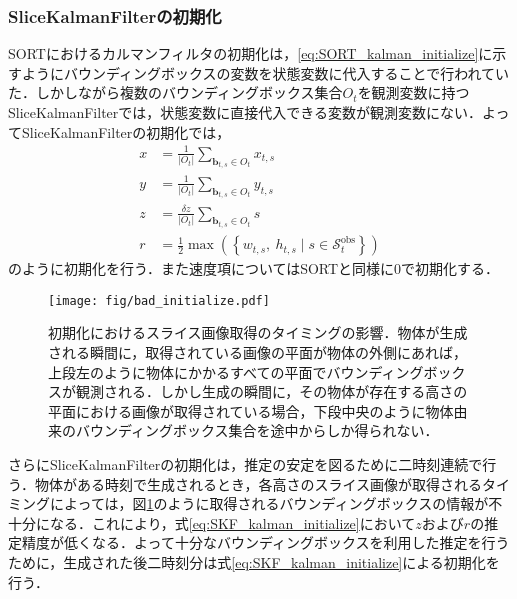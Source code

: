             \subsubsection{SliceKalmanFilterの初期化}

            SORTにおけるカルマンフィルタの初期化は，\ref{eq:SORT_kalman_initialize}に示すようにバウンディングボックスの変数を状態変数に代入することで行われていた．しかしながら複数のバウンディングボックス集合$O_t$を観測変数に持つSliceKalmanFilterでは，状態変数に直接代入できる変数が観測変数にない．よってSliceKalmanFilterの初期化では，
            \begin{equation}
                \label{eq:SKF_kalman_initialize}
                \begin{aligned}
                    x &= \frac{1}{\left|O_t\right|} \sum_{\bm{b}_{t,s} \in O_t} x_{t,s}
                    \\ y &= \frac{1}{\left|O_t\right|} \sum_{\bm{b}_{t,s} \in O_t} y_{t,s}
                    \\ z &= \frac{\delta z}{\left|O_t\right|} \sum_{\bm{b}_{t,s} \in O_t} s 
                    \\ r &= \frac{1}{2} \max \left(\left\{w_{t,s}, ~ h_{t,s} \mid s \in \mathcal{S}_t^{\text{obs}}\right\}\right)
                \end{aligned}
            \end{equation}
            のように初期化を行う．また速度項についてはSORTと同様に$0$で初期化する．

            \begin{figure}[t]
                \centering
                \texttt{[image: fig/bad\_initialize.pdf]}
                \caption[初期化におけるスライス画像取得のタイミングの影響]{初期化におけるスライス画像取得のタイミングの影響．物体が生成される瞬間に，取得されている画像の平面が物体の外側にあれば，上段左のように物体にかかるすべての平面でバウンディングボックスが観測される．しかし生成の瞬間に，その物体が存在する高さの平面における画像が取得されている場合，下段中央のように物体由来のバウンディングボックス集合を途中からしか得られない．}
                \label{fig:bad_initialize}
            \end{figure}

            さらにSliceKalmanFilterの初期化は，推定の安定を図るために二時刻連続で行う．物体がある時刻で生成されるとき，各高さのスライス画像が取得されるタイミングによっては，図\ref{fig:bad_initialize}のように取得されるバウンディングボックスの情報が不十分になる．これにより，式\ref{eq:SKF_kalman_initialize}において$z$および$r$の推定精度が低くなる．よって十分なバウンディングボックスを利用した推定を行うために，生成された後二時刻分は式\ref{eq:SKF_kalman_initialize}による初期化を行う．

